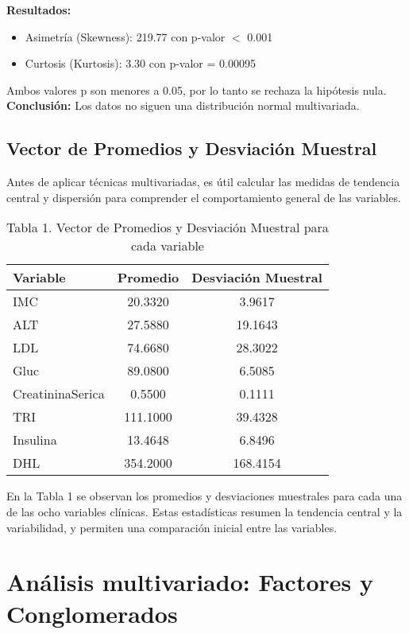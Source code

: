 \documentclass[12pt]{report}
\begin{document}
\textbf{Resultados:}
\begin{itemize}
    \item Asimetría (Skewness): 219.77 con p-valor $ < $ 0.001
    \item Curtosis (Kurtosis): 3.30 con p-valor = 0.00095
\end{itemize}

\noindent Ambos valores p son menores a 0.05, por lo tanto se rechaza la hipótesis nula. \\
\textbf{Conclusión:} Los datos no siguen una distribución normal multivariada.

\newpage

\section{Vector de Promedios y Desviación Muestral}
Antes de aplicar técnicas multivariadas, es útil calcular las medidas de tendencia central y dispersión para comprender el comportamiento general de las variables.

\begin{table}[H]
\centering
\begin{tabular}{|l|c|c|}
\hline
\textbf{Variable} & \textbf{Promedio} & \textbf{Desviación Muestral} \\
\hline
IMC & 20.3320 & 3.9617 \\
ALT & 27.5880 & 19.1643 \\
LDL & 74.6680 & 28.3022 \\
Gluc & 89.0800 & 6.5085 \\
CreatininaSerica & 0.5500 & 0.1111 \\
TRI & 111.1000 & 39.4328 \\
Insulina & 13.4648 & 6.8496 \\
DHL & 354.2000 & 168.4154 \\
\hline
\end{tabular}
\caption{Tabla 1. Vector de Promedios y Desviación Muestral para cada variable}
\end{table}

\noindent En la Tabla 1 se observan los promedios y desviaciones muestrales para cada una de las ocho variables clínicas. Estas estadísticas resumen la tendencia central y la variabilidad, y permiten una comparación inicial entre las variables.


\chapter{Análisis multivariado: Factores y Conglomerados}
\end{document}
